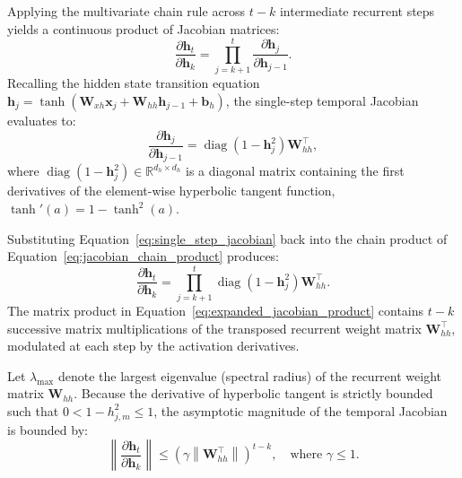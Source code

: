 \documentclass[../../main.tex]{subfiles}
\begin{document}
Applying the multivariate chain rule across $t - k$ intermediate recurrent steps yields a continuous product of Jacobian matrices:
\begin{equation}
\frac{\partial \mathbf{h}_t}{\partial \mathbf{h}_k} = \prod_{j=k+1}^t \frac{\partial \mathbf{h}_j}{\partial \mathbf{h}_{j-1}}.
\label{eq:jacobian_chain_product}
\end{equation}
Recalling the hidden state transition equation $\mathbf{h}_j = \tanh(\mathbf{W}_{xh} \mathbf{x}_j + \mathbf{W}_{hh} \mathbf{h}_{j-1} + \mathbf{b}_h)$, the single-step temporal Jacobian evaluates to:
\begin{equation}
\frac{\partial \mathbf{h}_j}{\partial \mathbf{h}_{j-1}} = \operatorname{diag}\left(1 - \mathbf{h}_j^2\right) \mathbf{W}_{hh}^\top,
\label{eq:single_step_jacobian}
\end{equation}
where $\operatorname{diag}(1 - \mathbf{h}_j^2) \in \mathbb{R}^{d_h \times d_h}$ is a diagonal matrix containing the first derivatives of the element-wise hyperbolic tangent function, $\tanh'(a) = 1 - \tanh^2(a)$.

Substituting Equation~\ref{eq:single_step_jacobian} back into the chain product of Equation~\ref{eq:jacobian_chain_product} produces:
\begin{equation}
\frac{\partial \mathbf{h}_t}{\partial \mathbf{h}_k} = \prod_{j=k+1}^t \operatorname{diag}\left(1 - \mathbf{h}_j^2\right) \mathbf{W}_{hh}^\top.
\label{eq:expanded_jacobian_product}
\end{equation}
The matrix product in Equation~\ref{eq:expanded_jacobian_product} contains $t - k$ successive matrix multiplications of the transposed recurrent weight matrix $\mathbf{W}_{hh}^\top$, modulated at each step by the activation derivatives.

Let $\lambda_{\max}$ denote the largest eigenvalue (spectral radius) of the recurrent weight matrix $\mathbf{W}_{hh}$. Because the derivative of hyperbolic tangent is strictly bounded such that $0 < 1 - h_{j, m}^2 \le 1$, the asymptotic magnitude of the temporal Jacobian is bounded by:
\begin{equation}
\left\| \frac{\partial \mathbf{h}_t}{\partial \mathbf{h}_k} \right\| \le \left( \gamma \left\| \mathbf{W}_{hh}^\top \right\| \right)^{t - k}, \quad \text{where } \gamma \le 1.
\label{eq:jacobian_norm_bound}
\end{equation}
\end{document}
